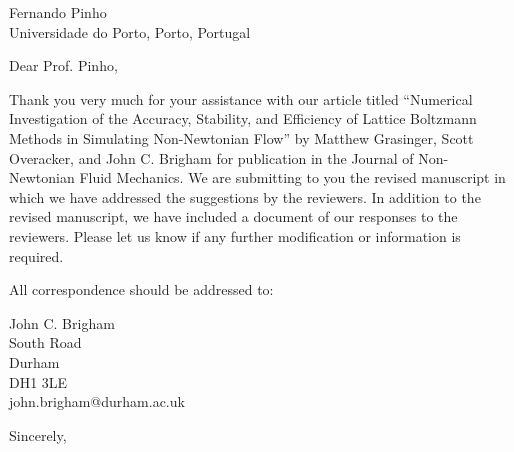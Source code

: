 \documentclass{letter}
\begin{document}
	\begin{letter}{Fernando Pinho \\ Universidade do Porto, Porto, Portugal}
		\opening{Dear Prof. Pinho,}
		Thank you very much for your assistance with our article titled ``Numerical Investigation of the Accuracy, Stability, and Efficiency of Lattice Boltzmann Methods in Simulating Non-Newtonian Flow'' by Matthew Grasinger, Scott Overacker, and John C. Brigham for publication in the Journal of Non-Newtonian Fluid Mechanics. We are submitting to you the revised manuscript in which we have addressed the suggestions by the reviewers. In addition to the revised manuscript, we have included a document of our responses to the reviewers. Please let us know if any further modification or information is required.
		
		All correspondence should be addressed to:
		
		John C. Brigham\\
		South Road\\
		Durham\\
		DH1 3LE\\
		john.brigham@durham.ac.uk
		
		\vspace{1in}
		\closing{Sincerely,}
	\end{letter}
\end{document}
